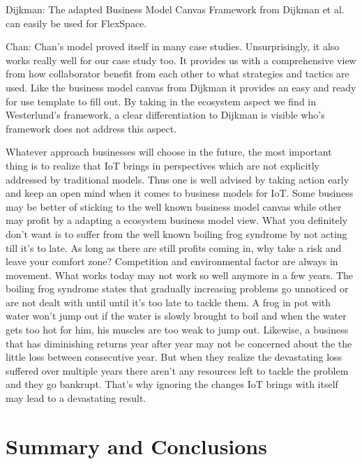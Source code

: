 	Dijkman: The adapted Business Model Canvas Framework from Dijkman et al. can easily be used for FlexSpace. 

	Chan: Chan's model proved itself in many case studies. Unsurprisingly, it also works really well for our case study too. It provides us with a comprehensive view from how collaborator benefit from each other to what strategies and tactics are used. Like the business model canvas from Dijkman it provides an easy and ready for use template to fill out. By taking in the ecosystem aspect we find in Westerlund's framework, a clear differentiation to Dijkman is visible who's framework does not address this aspect.

	Whatever approach businesses will choose in the future, the most important thing is to realize that IoT brings in perspectives which are not explicitly addressed by traditional models. Thus one is well advised by taking action early and keep an open mind when it comes to business models for IoT. Some business may be better of sticking to the well known business model canvas while other may profit by a adapting a ecosystem business model view. What you definitely don't want is to suffer from the well known boiling frog syndrome by not acting till it's to late. As long as there are still profits coming in, why take a risk and leave your comfort zone? Competition and environmental factor are always in movement. What works today may not work so well anymore in a few years. The boiling frog syndrome states that gradually increasing problems go unnoticed or are not dealt with until until it's too late to tackle them. A frog in pot with water won't jump out if the water is slowly brought to boil and when the water gets too hot for him, his muscles are too weak to jump out. Likewise, a business that has diminishing returns year after year may not be concerned about the the little loss between consecutive year. But when they realize the devastating loss suffered over multiple years there aren't any resources left to tackle the problem and they go bankrupt. That's why ignoring the changes IoT brings with itself may lead to a devastating result.

\section{Summary and Conclusions}
\label{sec:summary}
	
